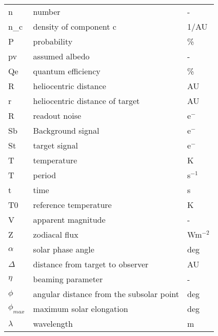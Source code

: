 \begin{table}[h!]
\begin{tabular}{l|l|l}
n               & number                                   & -             \\
n\_c            & density of component c                   & 1/AU  \\
P               & probability                              & \%            \\
pv              & assumed albedo                           & -             \\
Qe              & quantum efficiency                       & \%            \\
R               & heliocentric distance                    & AU            \\
r               & heliocentric distance of target          & AU            \\
R               & readout noise                            & e$^-$            \\
Sb              & Background signal                        & e$^-$            \\
St              & target signal                            & e$^-$            \\
T               & temperature                              & K             \\
T               & period                                   & s$^{-1}$           \\
t               & time                                     & s             \\
T0              & reference temperature                    & K             \\
V               & apparent magnitude                       & -             \\
Z               & zodiacal flux                            & Wm$^{-2}$          \\
$\alpha$           & solar phase angle                        & deg           \\
$\Delta$           & distance from target to observer         & AU            \\
$\eta$             & beaming parameter                        & -             \\
$\phi$             & angular distance from the subsolar point & deg           \\
$\phi_{max}$         & maximum solar elongation                 & deg           \\
$\lambda$          & wavelength                               & m             \\

\end{tabular}
\end{table}

